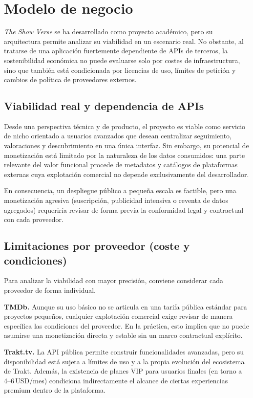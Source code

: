 \section{Modelo de negocio}

\textit{The Show Verse} se ha desarrollado como proyecto académico, pero su arquitectura permite analizar su viabilidad en un escenario real. No obstante, al tratarse de una aplicación fuertemente dependiente de APIs de terceros, la sostenibilidad económica no puede evaluarse solo por costes de infraestructura, sino que también está condicionada por licencias de uso, límites de petición y cambios de política de proveedores externos.

\subsection{Viabilidad real y dependencia de APIs}

Desde una perspectiva técnica y de producto, el proyecto es viable como servicio de nicho orientado a usuarios avanzados que desean centralizar seguimiento, valoraciones y descubrimiento en una única interfaz. Sin embargo, su potencial de monetización está limitado por la naturaleza de los datos consumidos: una parte relevante del valor funcional procede de metadatos y catálogos de plataformas externas cuya explotación comercial no depende exclusivamente del desarrollador.

En consecuencia, un despliegue público a pequeña escala es factible, pero una monetización agresiva (suscripción, publicidad intensiva o reventa de datos agregados) requeriría revisar de forma previa la conformidad legal y contractual con cada proveedor.

\subsection{Limitaciones por proveedor (coste y condiciones)}

Para analizar la viabilidad con mayor precisión, conviene considerar cada proveedor de forma individual.

\textbf{TMDb.} Aunque su uso básico no se articula en una tarifa pública estándar para proyectos pequeños, cualquier explotación comercial exige revisar de manera específica las condiciones del proveedor. En la práctica, esto implica que no puede asumirse una monetización directa y estable sin un marco contractual explícito.

\textbf{Trakt.tv.} La API pública permite construir funcionalidades avanzadas, pero su disponibilidad está sujeta a límites de uso y a la propia evolución del ecosistema de Trakt. Además, la existencia de planes VIP para usuarios finales (en torno a 4--6\,USD/mes) condiciona indirectamente el alcance de ciertas experiencias premium dentro de la plataforma.

